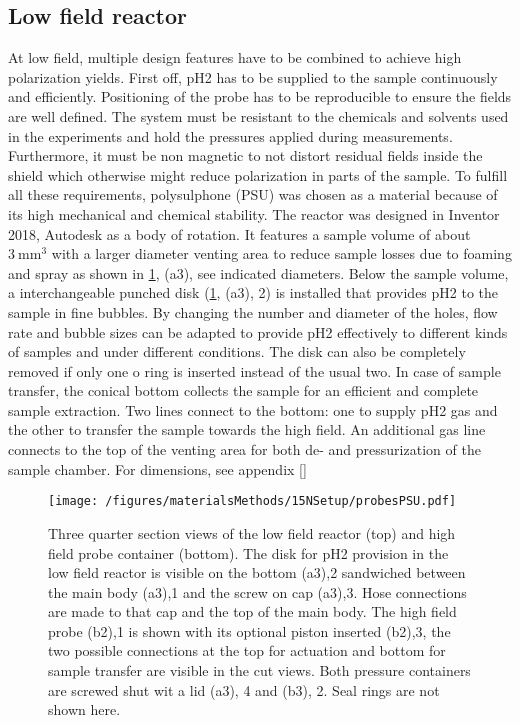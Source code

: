         \subsection{Low field reactor}
        \label{sec:matMeth:lowFieldReactor}
        At low field, multiple design features have to be combined to achieve high polarization yields.  First off, pH2 has to be supplied to the sample continuously and efficiently. Positioning of the probe has to be reproducible to ensure the fields are well defined.  The system must be resistant to the chemicals and solvents used in the experiments and hold the pressures applied during measurements.  Furthermore, it must be non magnetic to not distort residual fields inside the shield which otherwise might reduce polarization in parts of the sample. To fulfill all these requirements, polysulphone (PSU) was chosen as a material because of its high mechanical and chemical stability.  The reactor was designed in Inventor 2018, Autodesk as a body of rotation. It features a sample volume of about $\SI{3}{\mm\cubed}$ with a larger diameter venting area to reduce sample losses due to foaming and spray as shown in \ref{figure:materialsMethods:probesPSU}, (a3), see indicated diameters. Below the sample volume, a interchangeable punched disk (\ref{figure:materialsMethods:probesPSU}, (a3), 2) is installed that provides pH2 to the sample in fine bubbles. By changing the number and diameter of the holes, flow rate and bubble sizes can be adapted to provide pH2 effectively to different kinds of samples and under different conditions. The disk can also be completely removed if only one o ring is inserted instead of the usual two. In case of sample transfer, the conical bottom collects the sample for an efficient and complete sample extraction.  Two lines connect to the bottom: one to supply pH2 gas and the other to transfer the sample towards the high field.  An additional gas line connects to the top of the venting area for both de- and pressurization of the sample chamber.
        For dimensions, see appendix \ref{}
            \begin{figure}
                \centering
                \texttt{[image: /figures/materialsMethods/15NSetup/probesPSU.pdf]}
                \caption[Reactor gemometry]{Three quarter section views of the low field reactor (top) and high field probe container (bottom). The disk for pH2 provision in the low field reactor is visible on the bottom (a3),2 sandwiched between the main body (a3),1 and the screw on cap (a3),3.  Hose connections are made to that cap and the top of the main body. The high field probe (b2),1 is shown with its optional piston inserted (b2),3, the two possible connections at the top for actuation and bottom for sample transfer are visible in the cut views. Both pressure containers are screwed shut wit a lid (a3), 4 and (b3), 2. Seal rings are not shown here.}
                \label{figure:materialsMethods:probesPSU}
            \end{figure}
